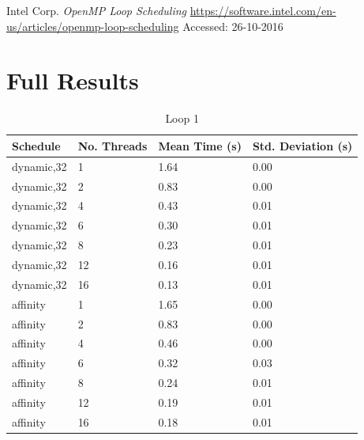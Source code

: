 \documentclass[a4paper,12pt]{article}
\begin{document}

\begin{thebibliography}{}
Intel Corp.
\textit{OpenMP Loop Scheduling}
\url{https://software.intel.com/en-us/articles/openmp-loop-scheduling}
Accessed: 26-10-2016

\end{thebibliography}

\pagebreak
\pagebreak
\appendix
\section{Full Results}

\begin {table}[H]
\caption {Loop 1}
\small
\center
\begin{tabular}{ | l | l | l | l | }
\hline
Schedule &  No. Threads &  Mean Time (s) &  Std. Deviation (s) \\ \hline
dynamic,32 & 1 & 1.64 & 0.00 \\ 
dynamic,32 & 2 & 0.83 & 0.00 \\ 
dynamic,32 & 4 & 0.43 & 0.01 \\ 
dynamic,32 & 6 & 0.30 & 0.01 \\ 
dynamic,32 & 8 & 0.23 & 0.01 \\ 
dynamic,32 & 12 & 0.16 & 0.01 \\ 
dynamic,32 & 16 & 0.13 & 0.01 \\
affinity & 1 & 1.65 & 0.00 \\
affinity & 2 & 0.83 & 0.00 \\
affinity & 4 & 0.46 & 0.00 \\
affinity & 6 & 0.32 & 0.03 \\
affinity & 8 & 0.24 & 0.01 \\
affinity & 12 & 0.19 & 0.01 \\
affinity & 16 & 0.18 & 0.01 \\ \hline
\end{tabular}
\end{table}
\end{document}
